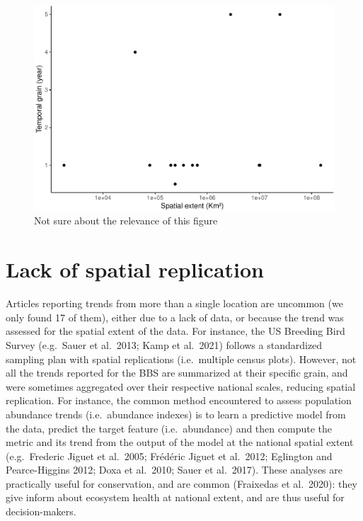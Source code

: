 \documentclass[
  12pt,
  oneside]{report}
\begin{document}
\begin{figure}
\centering
\includegraphics{literature_review_files/figure-latex/spacetimegrain-1.pdf}
\caption{\label{fig:spacetimegrain}Not sure about the relevance of this figure}
\end{figure}

\hypertarget{lack-of-spatial-replication}{%
\chapter{Lack of spatial replication}\label{lack-of-spatial-replication}}

Articles reporting trends from more than a single location are uncommon (we only found 17 of them), either due to a lack of data, or because the trend was assessed for the spatial extent of the data. For instance, the US Breeding Bird Survey (e.g.~Sauer et al.~2013; Kamp et al.~2021) follows a standardized sampling plan with spatial replications (i.e.~multiple census plots). However, not all the trends reported for the BBS are summarized at their specific grain, and were sometimes aggregated over their respective national scales, reducing spatial replication. For instance, the common method encountered to assess population abundance trends (i.e.~abundance indexes) is to learn a predictive model from the data, predict the target feature (i.e.~abundance) and then compute the metric and its trend from the output of the model at the national spatial extent (e.g.~Frederic Jiguet et al.~2005; Frédéric Jiguet et al.~2012; Eglington and Pearce-Higgins 2012; Doxa et al.~2010; Sauer et al.~2017). These analyses are practically useful for conservation, and are common (Fraixedas et al.~2020): they give inform about ecosystem health at national extent, and are thus useful for decision-makers.
\end{document}
